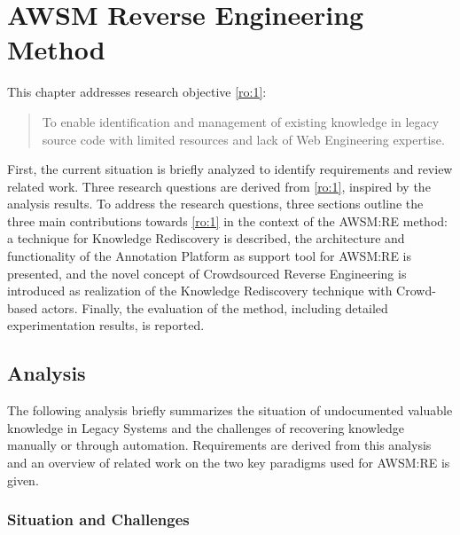 \hypertarget{sec:awsm-re}{%
\chapter{AWSM Reverse Engineering Method}\label{sec:awsm-re}}

This chapter addresses research objective \cref{ro:1}:

\begin{quote}
To enable identification and management of existing knowledge in legacy source code with limited resources and lack of \gls{Web Engineering} expertise.
\end{quote}

\vspace{-5pt}
First, the current situation is briefly analyzed to identify requirements and review related work.
Three research questions are derived from \cref{ro:1}, inspired by the analysis results. 
To address the research questions, three sections outline the three main contributions towards \cref{ro:1} in the context of the AWSM:RE method: a technique for Knowledge Rediscovery is described, the architecture and functionality of the Annotation Platform as support tool for AWSM:RE is presented, and the novel concept of Crowdsourced \gls{Reverse Engineering} is introduced as realization of the Knowledge Rediscovery technique with Crowd-based actors.
Finally, the evaluation of the method, including detailed experimentation results, is reported.

\vspace{-28pt}
\hypertarget{analysis}{%
\section{Analysis}\label{analysis}}
\vspace{4pt}

The following analysis briefly summarizes the situation of undocumented valuable knowledge in \glspl{Legacy System} and the challenges of recovering knowledge manually or through automation.
Requirements are derived from this analysis and an overview of related work on the two key paradigms used for AWSM:RE is given.

\subsection{Situation and Challenges}
\vspace{5pt}

